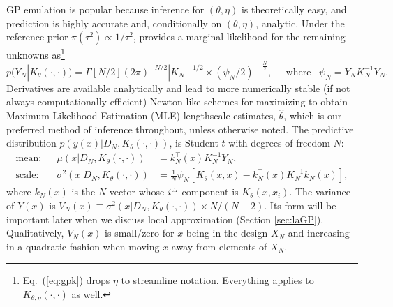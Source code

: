 \documentclass[12pt]{article}
\begin{document}
GP emulation is popular because inference for $(\theta,\eta)$ is
theoretically easy, and prediction is highly accurate and,
conditionally on $(\theta,\eta)$, analytic.  Under the reference prior
$\pi(\tau^2) \propto 1/\tau^2$, \citet{berger:deiliveira:sanso:2001} provides
a marginal likelihood for the remaining unknowns as\footnote{Eq.~(\ref{eq:gpk})
drops $\eta$ to streamline notation.
Everything applies to $K_{\theta, \eta}(\cdot, \cdot)$ as well.}
\begin{equation}
p(Y_N|K_\theta(\cdot, \cdot)) = \Gamma[N/2] (2\pi)^{-N/2}|K_N|^{-1/2} \times
\left(\psi_N/2\right)^{\!-\frac{N}{2}},
\label{eq:gpk}
\;\;\;\;\; \mbox{where} \;\;\;
\psi_N = Y_N^\top K_N^{-1} Y_N.
\end{equation}
Derivatives are available analytically and lead to more numerically stable (if
not always computationally efficient) Newton-like schemes for maximizing
to obtain Maximum Likelihood Estimation (MLE) lengthscale estimates, $\hat{\theta}$, which is our
preferred method of inference throughout, unless otherwise noted.
The predictive distribution $p(y(x) | D_N, K_\theta(\cdot, \cdot))$, is
Student-$t$ with degrees of freedom $N$:
\begin{align} 
  \mbox{mean:} && \mu(x|D_N, K_\theta(\cdot, \cdot)) &= k_N^\top(x)  K_N^{-1}Y_N,
\label{eq:predgp} \\ 
\mbox{scale:} && 
 \sigma^2(x|D_N, K_\theta(\cdot, \cdot)) &= \textstyle{\frac{1}{N}}   
\psi_N [K_\theta(x, x) - k_N^\top(x)K_N^{-1} k_N(x)],
\label{eq:preds2}
\end{align}
where $k_N(x)$ is the $N$-vector whose $i^{\mbox{\tiny th}}$ component is
$K_\theta(x,x_i)$. The variance of $Y(x)$ is $V_N(x) \equiv
\sigma^2(x|D_N,K_\theta(\cdot, \cdot))\times N/(N - 2)$. Its form will be 
important later when we discuss local approximation (Section \ref{sec:laGP}).
Qualitatively,  $V_N(x)$ is small/zero for $x$ being in the design $X_N$ and
increasing in a quadratic fashion when moving $x$ away from elements of $X_N$. %
\end{document}
